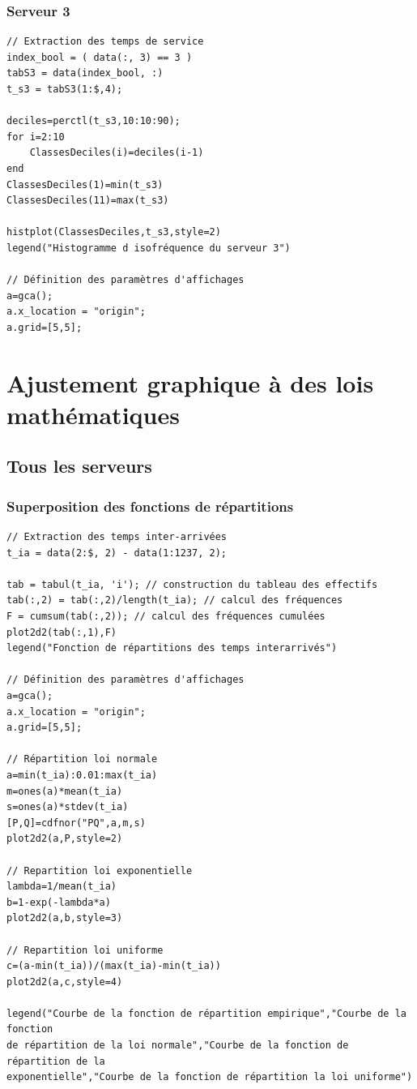 \documentclass{article}
\begin{document}
\subsubsection{Serveur 3}
\begin{verbatim}
// Extraction des temps de service
index_bool = ( data(:, 3) == 3 )
tabS3 = data(index_bool, :)
t_s3 = tabS3(1:$,4);

deciles=perctl(t_s3,10:10:90);
for i=2:10
    ClassesDeciles(i)=deciles(i-1)
end
ClassesDeciles(1)=min(t_s3)
ClassesDeciles(11)=max(t_s3)

histplot(ClassesDeciles,t_s3,style=2)
legend("Histogramme d isofréquence du serveur 3")

// Définition des paramètres d'affichages
a=gca();
a.x_location = "origin";
a.grid=[5,5];
\end{verbatim}

\section{Ajustement graphique à des lois mathématiques}

\subsection{Tous les serveurs}

\subsubsection{Superposition des fonctions de répartitions}
\begin{verbatim}
// Extraction des temps inter-arrivées
t_ia = data(2:$, 2) - data(1:1237, 2);

tab = tabul(t_ia, 'i'); // construction du tableau des effectifs
tab(:,2) = tab(:,2)/length(t_ia); // calcul des fréquences
F = cumsum(tab(:,2)); // calcul des fréquences cumulées
plot2d2(tab(:,1),F)
legend("Fonction de répartitions des temps interarrivés")

// Définition des paramètres d'affichages
a=gca();
a.x_location = "origin";
a.grid=[5,5];

// Répartition loi normale
a=min(t_ia):0.01:max(t_ia)
m=ones(a)*mean(t_ia)
s=ones(a)*stdev(t_ia)
[P,Q]=cdfnor("PQ",a,m,s)
plot2d2(a,P,style=2)

// Repartition loi exponentielle
lambda=1/mean(t_ia)
b=1-exp(-lambda*a)
plot2d2(a,b,style=3)

// Repartition loi uniforme
c=(a-min(t_ia))/(max(t_ia)-min(t_ia))
plot2d2(a,c,style=4)

legend("Courbe de la fonction de répartition empirique","Courbe de la fonction 
de répartition de la loi normale","Courbe de la fonction de répartition de la 
exponentielle","Courbe de la fonction de répartition la loi uniforme")
\end{verbatim}
\end{document}
